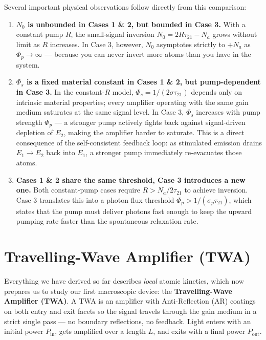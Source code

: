 Several important physical observations follow directly from this comparison:

\begin{enumerate}
    \item \textbf{$N_0$ is unbounded in Cases 1 \& 2, but bounded in Case 3.} With a constant pump $R$, the small-signal inversion $N_0 = 2R\tau_{21} - N_a$ grows without limit as $R$ increases. In Case 3, however, $N_0$ asymptotes strictly to $+N_a$ as $\Phi_p \to \infty$ — because you can never invert more atoms than you have in the system.

    \item \textbf{$\Phi_s$ is a fixed material constant in Cases 1 \& 2, but pump-dependent in Case 3.} In the constant-$R$ model, $\Phi_s = 1/(2\sigma\tau_{21})$ depends only on intrinsic material properties; every amplifier operating with the same gain medium saturates at the same signal level. In Case 3, $\Phi_s$ increases with pump strength $\Phi_p$ — a stronger pump actively fights back against signal-driven depletion of $E_2$, making the amplifier harder to saturate. This is a direct consequence of the self-consistent feedback loop: as stimulated emission drains $E_1 \to E_2$ back into $E_1$, a stronger pump immediately re-evacuates those atoms.

    \item \textbf{Cases 1 \& 2 share the same threshold, Case 3 introduces a new one.} Both constant-pump cases require $R > N_a/2\tau_{21}$ to achieve inversion. Case 3 translates this into a photon flux threshold $\Phi_p > 1/(\sigma_p\tau_{21})$, which states that the pump must deliver photons fast enough to keep the upward pumping rate faster than the spontaneous relaxation rate.
\end{enumerate}

\section{Travelling-Wave Amplifier (TWA)}

Everything we have derived so far describes \emph{local} atomic kinetics, which now prepares us to study our first macroscopic device: the \textbf{Travelling-Wave Amplifier (TWA)}. A TWA is an amplifier with Anti-Reflection (AR) coatings on both entry and exit facets so the signal travels through the gain medium in a strict single pass — no boundary reflections, no feedback. Light enters with an initial power $P_\text{in}$, gets amplified over a length $L$, and exits with a final power $P_\text{out}$.

